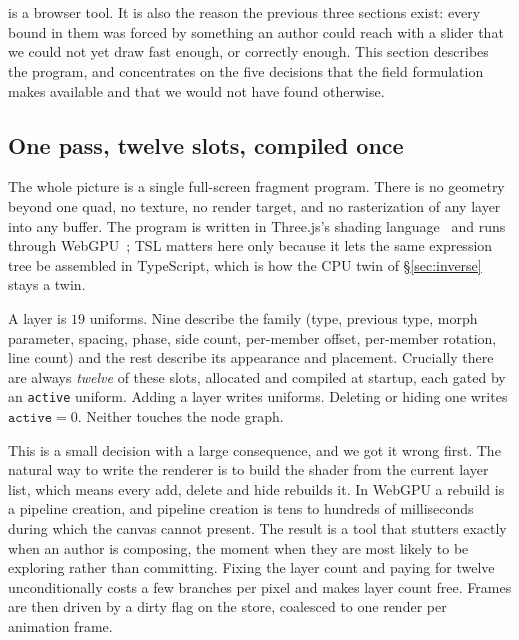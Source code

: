 \section{\Moire{}}
\label{sec:system}

\Moire{} is a browser tool. It is also the reason the previous three sections
exist: every bound in them was forced by something an author could reach with a
slider that we could not yet draw fast enough, or correctly enough. This section
describes the program, and concentrates on the five decisions that the field
formulation makes available and that we would not have found otherwise.

\subsection{One pass, twelve slots, compiled once}

The whole picture is a single full-screen fragment program. There is no geometry
beyond one quad, no texture, no render target, and no rasterization of any layer
into any buffer. The program is written in Three.js's shading
language~\cite{ThreeJS} and runs through WebGPU~\cite{WebGPU}; TSL matters here
only because it lets the same expression tree be assembled in TypeScript, which is
how the CPU twin of \S\ref{sec:inverse} stays a twin.

A layer is $19$ uniforms. Nine describe the family (type, previous type, morph
parameter, spacing, phase, side count, per-member offset, per-member rotation,
line count) and the rest describe its appearance and placement. Crucially there
are always \emph{twelve} of these slots, allocated and compiled at startup, each
gated by an \texttt{active} uniform. Adding a layer writes uniforms. Deleting or
hiding one writes $\texttt{active}=0$. Neither touches the node graph.

This is a small decision with a large consequence, and we got it wrong first. The
natural way to write the renderer is to build the shader from the current layer
list, which means every add, delete and hide rebuilds it. In WebGPU a rebuild is a
pipeline creation, and pipeline creation is tens to hundreds of milliseconds during
which the canvas cannot present. The result is a tool that stutters exactly when
an author is composing, the moment when they are most likely to be exploring
rather than committing. Fixing the layer count and paying for twelve unconditionally
costs a few branches per pixel and makes layer count free. Frames are then driven
by a dirty flag on the store, coalesced to one render per animation frame.

